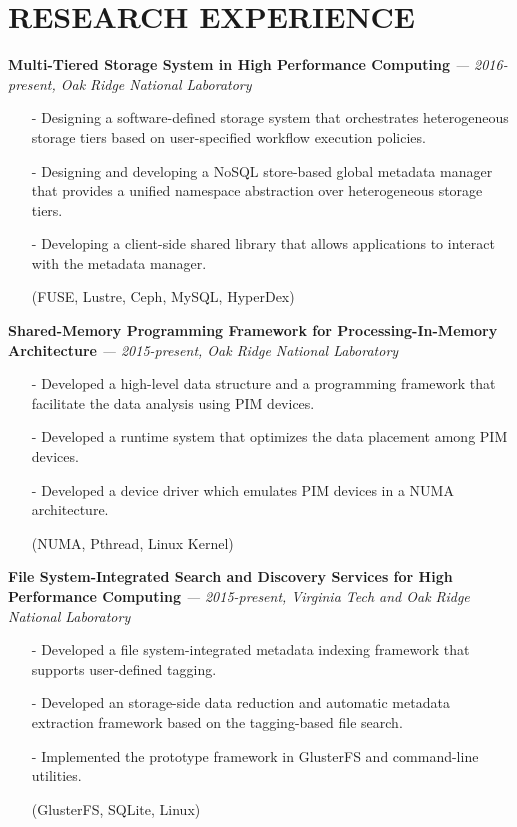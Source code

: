 \section{RESEARCH EXPERIENCE} 
\vspace{0.03in}
  {\bf Multi-Tiered Storage System in High Performance Computing}
   {\it \footnotesize --- 2016-present, Oak Ridge National Laboratory}
   \begin{itemize}[leftmargin=*]
    \setlength\itemsep{-0.02in}
    \item[-] Designing a software-defined storage system that orchestrates
	     heterogeneous storage tiers based on user-specified workflow execution
             policies.
    \item[-] Designing and developing a NoSQL store-based global metadata manager
	     that provides a unified namespace abstraction over heterogeneous
	     storage tiers.
    \item[-] Developing a client-side shared library that allows applications to interact
             with the metadata manager.
    \item[] {\small(FUSE, Lustre, Ceph, MySQL, HyperDex)}
   \end{itemize}
  \vspace{-0.15in}
  {\bf Shared-Memory Programming Framework for Processing-In-Memory Architecture}
   {\it \footnotesize --- 2015-present, Oak Ridge National Laboratory}
   \begin{itemize}[leftmargin=*]
    \setlength\itemsep{-0.02in}
    \item[-] Developed a high-level data structure and a programming framework that
             facilitate the data analysis using PIM devices.
    \item[-] Developed a runtime system that optimizes the data placement among PIM devices.
    \item[-] Developed a device driver which emulates PIM devices in a NUMA architecture.
    \item[] {\small(NUMA, Pthread, Linux Kernel)}
   \end{itemize}
  \vspace{-0.15in}
  {\bf File System-Integrated Search and Discovery Services for High Performance Computing}
   {\it \footnotesize --- 2015-present, Virginia Tech and Oak Ridge National Laboratory}
   \begin{itemize}[leftmargin=*]
    \setlength\itemsep{-0.02in}
    \item[-] Developed a file system-integrated metadata indexing framework
	     that supports user-defined tagging.
    \item[-] Developed an storage-side data reduction and automatic metadata
	     extraction framework based on the tagging-based file search.
    \item[-] Implemented the prototype framework in GlusterFS and command-line utilities.
    \item[] {\small(GlusterFS, SQLite, Linux)}
   \end{itemize}
